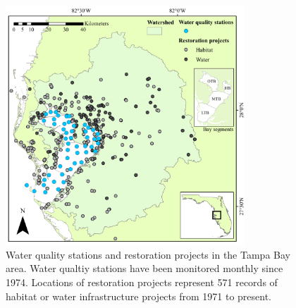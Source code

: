 \documentclass[]{article}
\begin{document}
\begin{figure}
\centerline{\includegraphics[width = 0.8\textwidth]{figs/tbrest_map.pdf}}
\caption{Water quality stations and restoration projects in the Tampa Bay area.  Water qualtiy stations have been monitored monthly since 1974.  Locations of restoration projects represent 571 records of habitat or water infrastructure projects from 1971 to present.}
\label{fig:map}
\end{figure}
\end{document}
